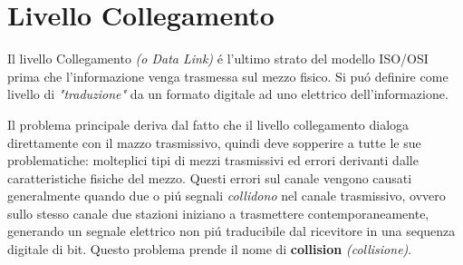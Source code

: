 \documentclass[12pt]{article}
\begin{document}
\date{}
\title{\vspace{-11ex}} %
 
\maketitle

\section{Livello Collegamento}\label{livello-collegamento}
Il livello Collegamento \textit{(o Data Link)} \'e l'ultimo strato del modello ISO/OSI prima che l'informazione venga 
trasmessa sul mezzo fisico. Si pu\'o definire come livello di \textit{"traduzione"} da un formato digitale ad uno 
elettrico dell'informazione.

Il problema principale deriva dal fatto che il livello collegamento dialoga direttamente con il mazzo trasmissivo, quindi 
deve sopperire a tutte le sue problematiche: molteplici tipi di mezzi trasmissivi ed errori derivanti dalle caratteristiche 
fisiche del mezzo. Questi errori sul canale vengono causati generalmente quando due o pi\'u segnali \textit{collidono} nel 
canale trasmissivo, ovvero sullo stesso canale due stazioni iniziano a trasmettere contemporaneamente, generando un segnale 
elettrico non pi\'u traducibile dal ricevitore in una sequenza digitale di bit. Questo problema prende il nome di 
\textbf{collision} \textit{(collisione)}.
\end{document}
